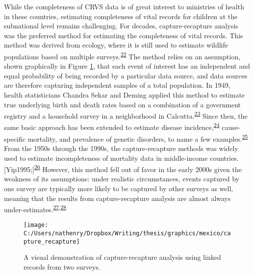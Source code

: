 \documentclass[
]{article}
\begin{document}
While the completeness of CRVS data is of great interest to ministries of health in these countries, estimating completeness of vital records for children at the subnational level remains challenging. For decades, capture-recapture analysis was the preferred method for estimating the completeness of vital records. This method was derived from ecology, where it is still used to estimate wildlife populations based on multiple surveys.\textsuperscript{\protect\hyperlink{ref-Smith1988}{22}} The method relies on an assumption, shown graphically in Figure \ref{fig:capture-recapture}, that each event of interest has an independent and equal probability of being recorded by a particular data source, and data sources are therefore capturing independent samples of a total population. In 1949, health statisticians Chandra Sekar and Deming applied this method to estimate true underlying birth and death rates based on a combination of a government registry and a household survey in a neighborhood in Calcutta.\textsuperscript{\protect\hyperlink{ref-ChandraSekar1949}{23}} Since then, the same basic approach has been extended to estimate disease incidence,\textsuperscript{\protect\hyperlink{ref-Tilling2001a}{24}} cause-specific mortality, and prevalence of genetic disorders, to name a few examples.\textsuperscript{\protect\hyperlink{ref-Hook1995}{25}} From the 1950s through the 1990s, the capture-recapture methods was widely used to estimate incompleteness of mortality data in middle-income countries.{[}Yip1995;{]}\textsuperscript{\protect\hyperlink{ref-Becker1996}{26}} However, this method fell out of favor in the early 2000s given the weakness of its assumptions: under realistic circumstances, events captured by one survey are typically more likely to be captured by other surveys as well, meaning that the results from capture-recapture analysis are almost always under-estimates.\textsuperscript{\protect\hyperlink{ref-Tilling2001}{27},\protect\hyperlink{ref-Cormack1999}{28}}

\begin{figure}[!ht]

{\centering \texttt{[image: C:/Users/nathenry/Dropbox/Writing/thesis/graphics/mexico/capture\_recapture]} 

}

\caption{A visual demonstration of capture-recapture analysis using linked records from two surveys.}\label{fig:capture-recapture}
\end{figure}
\end{document}
